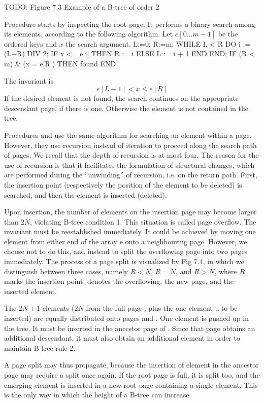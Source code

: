 TODO: Figure 7.3 Example of a B-tree of order 2

Procedure  starts by inspecting the root page. It performs a binary search among its elements, according to the following algorithm. Let $e[0 ... m-1]$ be the ordered keys and $x$ the search argument.
\begintt
L:=0; R:=m; WHILE L < R DO
i := (L+R) DIV 2;
IF x <= e[i] THEN R := i ELSE L := i + 1 END END;
IF (R < m) & (x = e[R]) THEN found END
\endtt

\noindent The invariant is
$$e[L-1] < x \le e[R]$$
If the desired element is not found, the search continues on the appropriate descendant page, if there is one. Otherwise the element is not contained in the tree.

Procedures  and  use the same algorithm for searching an element within a page. However, they use recursion instead of iteration to proceed along the search path of pages. We recall that the depth of recursion is at most four. The reason for the use of recursion is that it facilitates the formulation of structural changes, which are performed during the ``unwinding'' of recursion, i.e. on the return path. First, the insertion point (respectively the position of the element to be deleted) is searched, and then the element is inserted (deleted).

Upon insertion, the number of elements on the insertion page may become larger than $2N$, violating B-tree condition 1. This situation is called page overflow. The invariant must be reestablished immediately. It could be achieved by moving one element from either end of the array e onto a neighbouring page. However, we choose not to do this, and instead to split the overflowing page into two pages immediately. The process of a page split is visualized by Fig 7.4, in which we distinguish between three cases, namely $R < N$, $R = N$, and $R > N$, where $R$ marks the insertion point.  denotes the overflowing,  the new page, and  the inserted element.

The $2N + 1$ elements ($2N$ from the full page , plus the one element u to be inserted) are equally distributed onto pages  and . One element  is pushed up in the tree. It must be inserted in the ancestor page of . Since that page obtains an additional descendant, it must also obtain an additional element in order to maintain B-tree rule 2.

A page split may thus propagate, because the insertion of element  in the ancestor page may require a split once again. If the root page is full, it is split too, and the emerging element  is inserted in a new root page containing a single element. This is the only way in which the height of a B-tree can increase.

